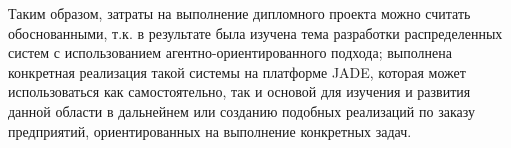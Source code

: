 Таким образом, затраты на выполнение дипломного проекта можно считать обоснованными, т.к. в результате была изучена тема разработки распределенных систем с использованием агентно-ориентированного подхода; выполнена конкретная реализация такой системы на платформе JADE, которая может использоваться как самостоятельно, так и основой для изучения и развития данной области в дальнейнем или созданию подобных реализаций по заказу предприятий, ориентированных на выполнение конкретных задач.
